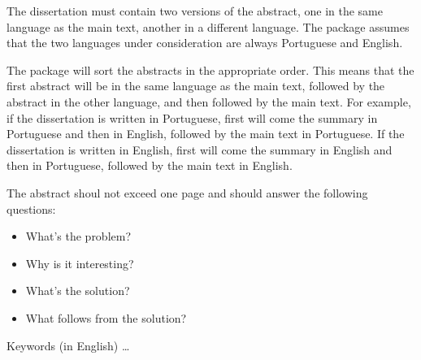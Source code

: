 

The dissertation must contain two versions of the abstract, one in the same language as the main text, another in a different language.  The package assumes that the two languages under consideration are always Portuguese and English.

The package will sort the abstracts in the appropriate order. This means that the first abstract will be in the same language as the main text, followed by the abstract in the other language, and then followed by the main text. For example, if the dissertation is written in Portuguese, first will come the summary in Portuguese and then in English, followed by the main text in Portuguese. If the dissertation is written in English, first will come the summary in English and then in Portuguese, followed by the main text in English.

The abstract shoul not exceed one page and should answer the following questions:

\begin{itemize}
	\item What's the problem?
	\item Why is it interesting?
	\item What's the solution?
	\item What follows from the solution?
\end{itemize}

\begin{keywords}
Keywords (in English) \ldots
\end{keywords} 
